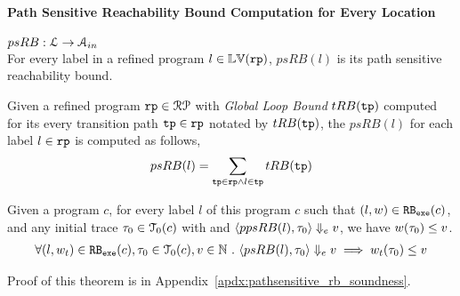 \paragraph*{Path Sensitive Reachability Bound Computation for Every Location}
$psRB : \mathcal{L} \to \mathcal{A}_{in}$
\\
For every label in a refined program $l \in \mathbb{LV}(\mathtt{rp})$,
 $psRB(l)$ is its path sensitive reachability bound.
 \\
 \begin{defn}
  \label{def:label_psrb}
Given a refined program $\mathtt{rp} \in \mathcal{RP}$ with 
\emph{Global Loop Bound} $tRB(\mathtt{tp})$
computed for its every transition path $\mathtt{tp} \in \mathtt{rp}$  notated by $tRB(\mathtt{tp})$,
the $psRB(l)$ for each label $l \in \mathtt{rp}$ is computed as follows,
\\
\[ psRB(l) = \sum\limits_{\mathtt{tp} \in \mathtt{rp} \land 
l \in \mathtt{tp}} tRB(\mathtt{tp})\]
 \end{defn}
\begin{thm}
  \label{thm:pathsensitive_rb_soundness}
Given a program ${c}$, for every label $l$ of this program $c$ such that $(l, w) \in \mathtt{RB_{exe}}(c)$, 
and any initial trace $\mathtt{\tau}_0 \in \mathcal{T}_0(c)$ with 
and $\langle ppsRB(l), \mathtt{\tau}_0 \rangle \Downarrow_e v$,
we have $ w(\mathtt{\tau}_0) \leq v $.
%
\[
  \begin{array}{l}
  \forall (l, w_{t}) \in \mathtt{RB_{exe}}(c),
  \mathtt{\tau}_0 \in \mathcal{T}_0(c), 
  v \in \mathbb{N} ~.~
  \langle psRB(l), \mathtt{\tau}_0 \rangle \Downarrow_e v
  \implies
  w_{t}(\mathtt{\tau}_0) \leq v
  \end{array}
\]
\end{thm}
%
Proof of this theorem is in Appendix~\ref{apdx:pathsensitive_rb_soundness}.